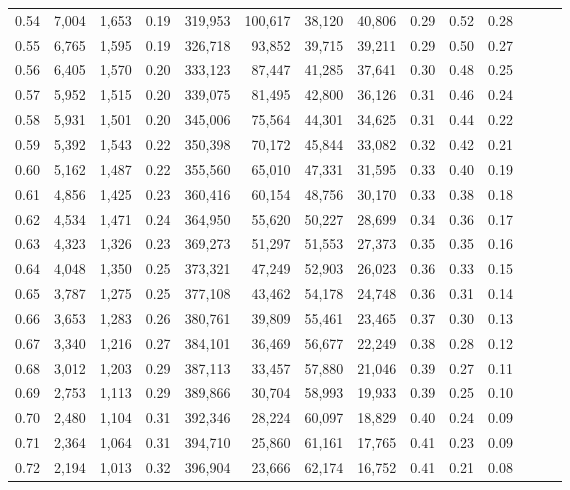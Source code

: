 \begin{tabular}{rrrrrrrrrrrrrr}
0.54 &  7,004 &  1,653 &  0.19 &  319,953 &  100,617 &  38,120 &  40,806 &  0.29 &  0.52 &      0.28 \\
0.55 &  6,765 &  1,595 &  0.19 &  326,718 &   93,852 &  39,715 &  39,211 &  0.29 &  0.50 &      0.27 \\
0.56 &  6,405 &  1,570 &  0.20 &  333,123 &   87,447 &  41,285 &  37,641 &  0.30 &  0.48 &      0.25 \\
0.57 &  5,952 &  1,515 &  0.20 &  339,075 &   81,495 &  42,800 &  36,126 &  0.31 &  0.46 &      0.24 \\
0.58 &  5,931 &  1,501 &  0.20 &  345,006 &   75,564 &  44,301 &  34,625 &  0.31 &  0.44 &      0.22 \\
0.59 &  5,392 &  1,543 &  0.22 &  350,398 &   70,172 &  45,844 &  33,082 &  0.32 &  0.42 &      0.21 \\
0.60 &  5,162 &  1,487 &  0.22 &  355,560 &   65,010 &  47,331 &  31,595 &  0.33 &  0.40 &      0.19 \\
0.61 &  4,856 &  1,425 &  0.23 &  360,416 &   60,154 &  48,756 &  30,170 &  0.33 &  0.38 &      0.18 \\
0.62 &  4,534 &  1,471 &  0.24 &  364,950 &   55,620 &  50,227 &  28,699 &  0.34 &  0.36 &      0.17 \\
0.63 &  4,323 &  1,326 &  0.23 &  369,273 &   51,297 &  51,553 &  27,373 &  0.35 &  0.35 &      0.16 \\
0.64 &  4,048 &  1,350 &  0.25 &  373,321 &   47,249 &  52,903 &  26,023 &  0.36 &  0.33 &      0.15 \\
0.65 &  3,787 &  1,275 &  0.25 &  377,108 &   43,462 &  54,178 &  24,748 &  0.36 &  0.31 &      0.14 \\
0.66 &  3,653 &  1,283 &  0.26 &  380,761 &   39,809 &  55,461 &  23,465 &  0.37 &  0.30 &      0.13 \\
0.67 &  3,340 &  1,216 &  0.27 &  384,101 &   36,469 &  56,677 &  22,249 &  0.38 &  0.28 &      0.12 \\
0.68 &  3,012 &  1,203 &  0.29 &  387,113 &   33,457 &  57,880 &  21,046 &  0.39 &  0.27 &      0.11 \\
0.69 &  2,753 &  1,113 &  0.29 &  389,866 &   30,704 &  58,993 &  19,933 &  0.39 &  0.25 &      0.10 \\
0.70 &  2,480 &  1,104 &  0.31 &  392,346 &   28,224 &  60,097 &  18,829 &  0.40 &  0.24 &      0.09 \\
0.71 &  2,364 &  1,064 &  0.31 &  394,710 &   25,860 &  61,161 &  17,765 &  0.41 &  0.23 &      0.09 \\
0.72 &  2,194 &  1,013 &  0.32 &  396,904 &   23,666 &  62,174 &  16,752 &  0.41 &  0.21 &      0.08 \\

\end{tabular}
